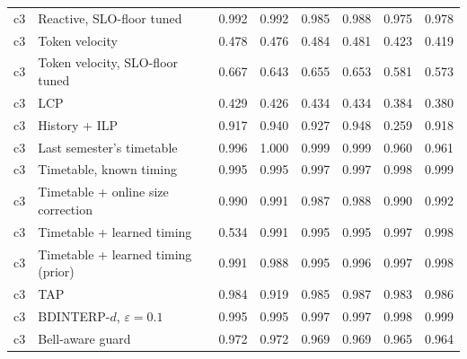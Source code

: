 \begin{tabular}{@{}llrrrrrr@{}}
c3 & Reactive, SLO-floor tuned & 0.992 & 0.992 & 0.985 & 0.988 & 0.975 & 0.978 \\
c3 & Token velocity & 0.478 & 0.476 & 0.484 & 0.481 & 0.423 & 0.419 \\
c3 & Token velocity, SLO-floor tuned & 0.667 & 0.643 & 0.655 & 0.653 & 0.581 & 0.573 \\
c3 & LCP & 0.429 & 0.426 & 0.434 & 0.434 & 0.384 & 0.380 \\
c3 & History + ILP & 0.917 & 0.940 & 0.927 & 0.948 & 0.259 & 0.918 \\
c3 & Last semester's timetable & 0.996 & 1.000 & 0.999 & 0.999 & 0.960 & 0.961 \\
c3 & Timetable, known timing & 0.995 & 0.995 & 0.997 & 0.997 & 0.998 & 0.999 \\
c3 & Timetable + online size correction & 0.990 & 0.991 & 0.987 & 0.988 & 0.990 & 0.992 \\
c3 & Timetable + learned timing & 0.534 & 0.991 & 0.995 & 0.995 & 0.997 & 0.998 \\
c3 & Timetable + learned timing (prior) & 0.991 & 0.988 & 0.995 & 0.996 & 0.997 & 0.998 \\
c3 & TAP & 0.984 & 0.919 & 0.985 & 0.987 & 0.983 & 0.986 \\
c3 & BDINTERP-$d$, $\varepsilon=0.1$ & 0.995 & 0.995 & 0.997 & 0.997 & 0.998 & 0.999 \\
c3 & Bell-aware guard & 0.972 & 0.972 & 0.969 & 0.969 & 0.965 & 0.964 \\
\bottomrule
\end{tabular}
